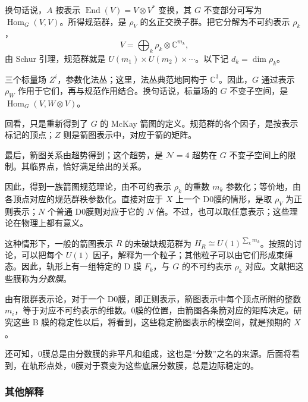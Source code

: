 换句话说，$A$ 按表示 $\operatorname{End}(V)=V\otimes V^*$ 变换，其 $G$ 不变部分可写为 $\operatorname{Hom}_G(V,V)$。所得规范群，是 $\rho_V$ 的幺正交换子群。把它分解为不可约表示 $\rho_k$，
\[
V=\bigoplus_k\rho_k\otimes\mathbb{C}^{m_k},
\]
由 Schur 引理，规范群就是 $U(m_1)\times U(m_2)\times\cdots$。以下记 $d_k=\dim\rho_k$。

三个标量场 $Z^i$，参数化法丛；这里，法丛典范地同构于 $\mathbb{C}^3$。因此，$G$ 通过表示 $\rho_W$ 作用于它们，再与规范作用结合。换句话说，标量场的 $G$ 不变子空间，是 $\operatorname{Hom}_G(V,W\otimes V)$。

回看，只是重新得到了 $G$ 的 McKay 箭图的定义。规范群的各个因子，是按表示标记的顶点；$Z$ 则是箭图表示中，对应于箭的矩阵。

最后，箭图关系由超势得到；这个超势，是 $\mathcal{N}=4$ 超势在 $G$ 不变子空间上的限制。其临界点，恰好满足给出的关系。

因此，得到一族箭图规范理论，由不可约表示 $\rho_k$ 的重数 $m_k$ 参数化；等价地，由各顶点对应的规范群秩参数化。直接对应于 $X$ 上一个 D0膜的情形，是取 $\rho_V$ 为正则表示；$N$ 个普通 D0膜则对应于它的 $N$ 倍。不过，也可以取任意表示；这些理论在物理上都有意义。

这种情形下，一般的箭图表示 $R$ 的未破缺规范群为 $H_R\cong U(1)^{\sum_km_k}$。按照的讨论，可以把每个 $U(1)$ 因子，解释为一个粒子；其他粒子可以由它们形成束缚态。因此，轨形上有一组特定的 D 膜 $F_k$，与 $G$ 的不可约表示 $\rho_k$ 对应。文献把这些膜称为\emph{分数膜}。

由有限群表示论，对于一个 D0膜，即正则表示，箭图表示中每个顶点所附的整数 $m_i$，等于对应不可约表示的维数。0膜的位置，由箭图各条箭对应的矩阵决定。研究这些 B 膜的稳定性以后，将看到，这些稳定箭图表示的模空间，就是预期的 $X$。

还可知，0膜总是由分数膜的非平凡和组成，这也是“分数”之名的来源。后面将看到，在轨形点处，0膜对于衰变为这些底层分数膜，总是边际稳定的。

\subsubsection{其他解释}\label{sec:5.4.5.1}

